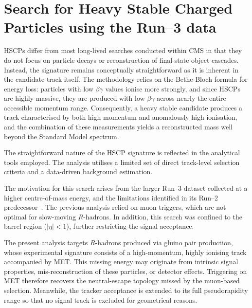 \chapter{Search for Heavy Stable Charged Particles using the Run--3 data}
\label{ch:chapitre4}
\minitoc


HSCPs differ from most long-lived searches conducted within CMS in that they do not focus on particle decays or reconstruction of final-state object cascades. Instead, the signature remains conceptually straightforward as it is inherent in the candidate track itself. The methodology relies on the Bethe-Bloch formula for energy loss: particles with low $\beta\gamma$ values ionise more strongly, and since HSCPs are highly massive, they are produced with low $\beta\gamma$ across nearly the entire accessible momentum range. Consequently, a heavy stable candidate produces a track characterised by both high momentum and anomalously high ionisation, and the combination of these measurements yields a reconstructed mass well beyond the Standard Model spectrum.

The straightforward nature of the HSCP signature is reflected in the analytical tools employed. The analysis utilises a limited set of direct track-level selection criteria and a data-driven background estimation.

\vspace{0.5 cm}

The motivation for this search arises from the larger Run--3 dataset collected at a higher centre-of-mass energy, and the limitations identified in its Run--2 predecessor~\cite{HSCP_Run2}. The previous analysis relied on muon triggers, which are not optimal for slow-moving $R$-hadrons. In addition, this search was confined to the barrel region ($|\eta|<1$), further restricting the signal acceptance.

The present analysis targets $R$-hadrons produced via gluino pair production, whose experimental signature consists of a high-momentum, highly ionising track accompanied by MET. This missing energy may originate from intrinsic signal properties, mis-reconstruction of these particles, or detector effects. Triggering on MET therefore recovers the neutral-escape topology missed by the muon-based selection. Meanwhile, the tracker acceptance is extended to its full pseudorapidity range so that no signal track is excluded for geometrical reasons.

\vspace{0.5 cm}

